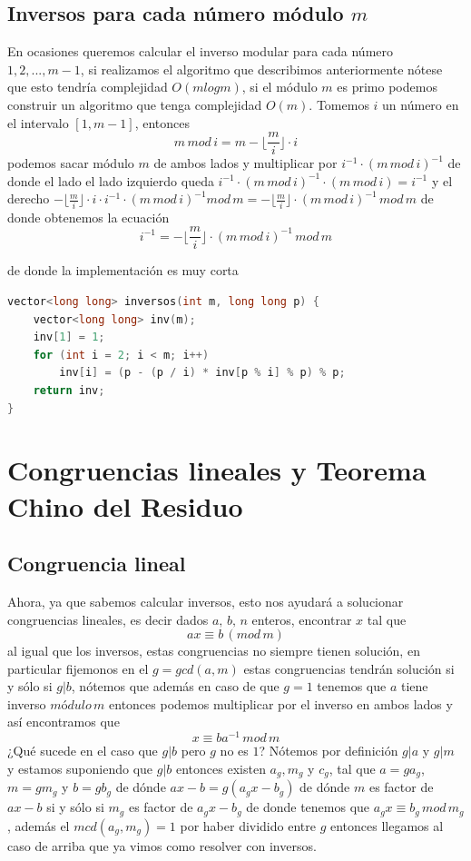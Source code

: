 \subsection*{Inversos para cada número módulo $m$}

En ocasiones queremos calcular el inverso modular para cada número $1,2,...,m-1$, si realizamos el algoritmo que describimos anteriormente nótese que esto tendría complejidad $O(m log m)$, si el módulo $m$ es primo podemos construir un algoritmo que tenga complejidad $O(m)$. Tomemos $i$ un número en el intervalo $[1,m-1]$, entonces
\[m \, mod \, i = m - \lfloor \frac{m}{i} \rfloor \cdot i\]
podemos sacar módulo $m$ de ambos lados y multiplicar por $i^{-1} \cdot (m \, mod \, i)^{-1}$ de donde el lado el lado izquierdo queda $i^{-1} \cdot (m \, mod \, i)^{-1} \cdot (m \, mod \, i)=i^{-1}$ y el derecho $- \lfloor \frac{m}{i} \rfloor \cdot i \cdot i^{-1} \cdot (m \, mod \, i)^{-1} mod \, m=- \lfloor \frac{m}{i} \rfloor \cdot (m \, mod \, i)^{-1} \, mod \, m$ de donde obtenemos la ecuación
\[i^{-1} = - \lfloor \frac{m}{i} \rfloor \cdot (m \, mod \, i)^{-1} \, mod \, m\]
 
de donde la implementación es muy corta

\begin{lstlisting}[language=C++]
vector<long long> inversos(int m, long long p) {
    vector<long long> inv(m);
    inv[1] = 1;
    for (int i = 2; i < m; i++)
        inv[i] = (p - (p / i) * inv[p % i] % p) % p;
    return inv;
}
\end{lstlisting}

\section{Congruencias lineales y Teorema Chino del Residuo} 
\subsection*{Congruencia lineal}

Ahora, ya que sabemos calcular inversos, esto nos ayudará a solucionar congruencias lineales, es decir dados $a,\, b, \, n$ enteros, encontrar $x$ tal que\[ax \equiv b \,( mod \, m)\]
al igual que los inversos, estas congruencias no siempre tienen solución, en particular fijemonos en el $g=gcd(a,m)$ estas congruencias tendrán solución si y sólo si $g | b$, nótemos que además en caso de que $g=1$ tenemos que $a$ tiene inverso $módulo \, m$ entonces podemos multiplicar por el inverso en ambos lados y así encontramos que
\[x \equiv b a^{-1} \, mod \, m\]
¿Qué sucede en el caso que $g | b$ pero $g$ no es $1$? Nótemos por definición $g | a$ y $g | m$ y estamos suponiendo que $g | b$ entonces existen $a_g, m_g$ y $c_g$, tal que $a=ga_g$, $m=gm_g$ y $b=gb_g$ de dónde $ax-b=g(a_gx-b_g)$ de dónde $m$ es factor de $ax-b$ si y sólo si $m_g$ es factor de $a_gx-b_g$ de donde tenemos que $a_gx \equiv b_g \, mod \, m_g $, además el $mcd(a_g, m_g)=1$ por haber dividido entre $g$ entonces llegamos al caso de arriba que ya vimos como resolver con inversos.

